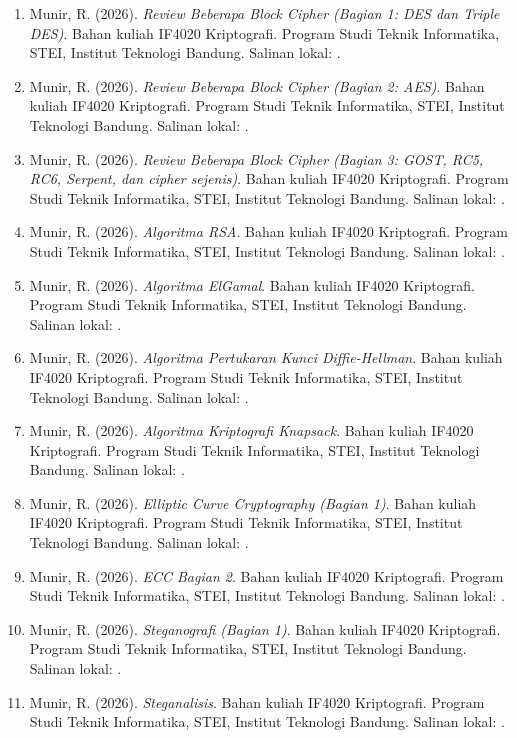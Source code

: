 \documentclass[12pt,a4paper]{article}
\begin{document}
\begin{sloppypar}
\begin{enumerate}[leftmargin=*]
  \item Munir, R. (2026). \textit{Review Beberapa Block Cipher (Bagian 1: DES dan Triple DES)}. Bahan kuliah IF4020 Kriptografi. Program Studi Teknik Informatika, STEI, Institut Teknologi Bandung. Salinan lokal: .
  \item Munir, R. (2026). \textit{Review Beberapa Block Cipher (Bagian 2: AES)}. Bahan kuliah IF4020 Kriptografi. Program Studi Teknik Informatika, STEI, Institut Teknologi Bandung. Salinan lokal: .
  \item Munir, R. (2026). \textit{Review Beberapa Block Cipher (Bagian 3: GOST, RC5, RC6, Serpent, dan cipher sejenis)}. Bahan kuliah IF4020 Kriptografi. Program Studi Teknik Informatika, STEI, Institut Teknologi Bandung. Salinan lokal: .
  \item Munir, R. (2026). \textit{Algoritma RSA}. Bahan kuliah IF4020 Kriptografi. Program Studi Teknik Informatika, STEI, Institut Teknologi Bandung. Salinan lokal: .
  \item Munir, R. (2026). \textit{Algoritma ElGamal}. Bahan kuliah IF4020 Kriptografi. Program Studi Teknik Informatika, STEI, Institut Teknologi Bandung. Salinan lokal: .
  \item Munir, R. (2026). \textit{Algoritma Pertukaran Kunci Diffie-Hellman}. Bahan kuliah IF4020 Kriptografi. Program Studi Teknik Informatika, STEI, Institut Teknologi Bandung. Salinan lokal: .
  \item Munir, R. (2026). \textit{Algoritma Kriptografi Knapsack}. Bahan kuliah IF4020 Kriptografi. Program Studi Teknik Informatika, STEI, Institut Teknologi Bandung. Salinan lokal: .
  \item Munir, R. (2026). \textit{Elliptic Curve Cryptography (Bagian 1)}. Bahan kuliah IF4020 Kriptografi. Program Studi Teknik Informatika, STEI, Institut Teknologi Bandung. Salinan lokal: .
  \item Munir, R. (2026). \textit{ECC Bagian 2}. Bahan kuliah IF4020 Kriptografi. Program Studi Teknik Informatika, STEI, Institut Teknologi Bandung. Salinan lokal: .
  \item Munir, R. (2026). \textit{Steganografi (Bagian 1)}. Bahan kuliah IF4020 Kriptografi. Program Studi Teknik Informatika, STEI, Institut Teknologi Bandung. Salinan lokal: .
  \item Munir, R. (2026). \textit{Steganalisis}. Bahan kuliah IF4020 Kriptografi. Program Studi Teknik Informatika, STEI, Institut Teknologi Bandung. Salinan lokal: .
\end{enumerate}
\end{sloppypar}
\end{document}
